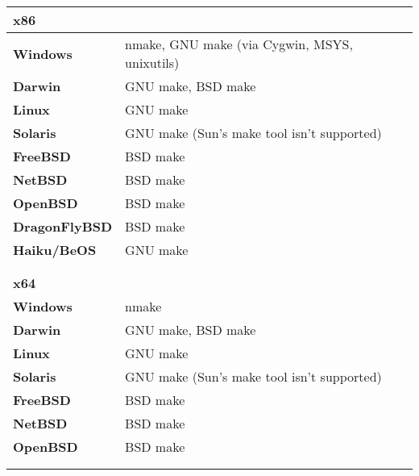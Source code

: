 \begin{tabular}{l l}
{\bf{\large x86}}             &                                                      \\
\hline\hline
{\bf Windows}                 & nmake, GNU make (via Cygwin, MSYS, unixutils)        \\
{\bf Darwin}                  & GNU make, BSD make                                   \\
{\bf Linux}                   & GNU make                                             \\
{\bf Solaris}                 & GNU make (Sun's make tool isn't supported)           \\
{\bf FreeBSD}                 & BSD make                                             \\
{\bf NetBSD}                  & BSD make                                             \\
{\bf OpenBSD}                 & BSD make                                             \\
{\bf DragonFlyBSD}            & BSD make                                             \\
{\bf Haiku/BeOS}              & GNU make                                             \\
\hline
                              &                                                      \\
                              &                                                      \\


{\bf{\large x64}}             &                                                      \\
\hline\hline
{\bf Windows}                 & nmake                                                \\
{\bf Darwin}                  & GNU make, BSD make                                   \\
{\bf Linux}                   & GNU make                                             \\
{\bf Solaris}                 & GNU make (Sun's make tool isn't supported)           \\
{\bf FreeBSD}                 & BSD make                                             \\
{\bf NetBSD}                  & BSD make                                             \\
{\bf OpenBSD}                 & BSD make                                             \\
\hline
                              &                                                      \\
                              &                                                      \\



\end{tabular}
